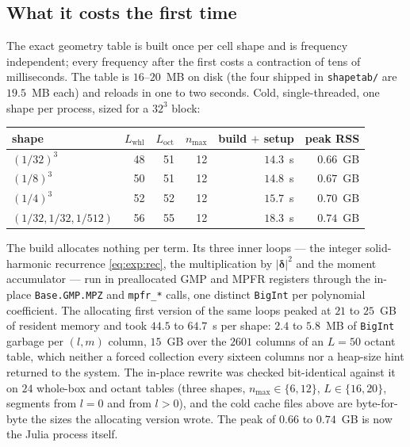 \documentclass[11pt]{article}
\theoremstyle{remark}
\newcommand{\code}[1]{\texttt{#1}}
\begin{document}
\subsection{What it costs the first time}
\label{sec:use:cost}

The exact geometry table is built once per cell shape and is frequency independent; every
frequency after the first costs a contraction of tens of milliseconds. The table is
$16$--$20$~MB on disk (the four shipped in \code{shapetab/} are $19.5$~MB each) and reloads
in one to two seconds. Cold, single-threaded, one shape per
process, sized for a $32^3$ block:

\begin{center}\small
\begin{tabular}{@{}lrrrrr@{}}
\toprule
shape & $L_{\mathrm{whl}}$ & $L_{\mathrm{oct}}$ & $n_{\max}$ & build $+$ setup & peak RSS\\
\midrule
$(1/32)^3$ & 48 & 51 & 12 & $14.3$~s & $0.66$~GB\\
$(1/8)^3$  & 50 & 51 & 12 & $14.8$~s & $0.67$~GB\\
$(1/4)^3$  & 52 & 52 & 12 & $15.7$~s & $0.70$~GB\\
$(1/32,1/32,1/512)$ & 56 & 55 & 12 & $18.3$~s & $0.74$~GB\\
\bottomrule
\end{tabular}
\end{center}

\noindent
The build allocates nothing per term. Its three inner loops --- the integer
solid-harmonic recurrence \eqref{eq:exp:rec}, the multiplication by $|\boldsymbol{\delta}|^2$
and the moment accumulator --- run in preallocated GMP and MPFR registers through the
in-place \code{Base.GMP.MPZ} and \code{mpfr\_*} calls, one distinct \code{BigInt} per
polynomial coefficient. The allocating first version of the same loops peaked at $21$ to
$25$~GB of resident memory and took $44.5$ to $64.7$~s per shape: $2.4$ to $5.8$~MB of
\code{BigInt} garbage per $(l,m)$ column, $15$~GB over the $2601$ columns of an $L = 50$
octant table, which neither a forced collection every sixteen columns nor a heap-size hint
returned to the system. The in-place rewrite was checked bit-identical against it on
$24$ whole-box and octant tables (three shapes, $n_{\max} \in \{6, 12\}$, $L \in \{16, 20\}$,
segments from $l = 0$ and from $l > 0$), and the cold cache files above are byte-for-byte the
sizes the allocating version wrote. The peak of $0.66$ to $0.74$~GB is now the Julia
process itself.
\end{document}

